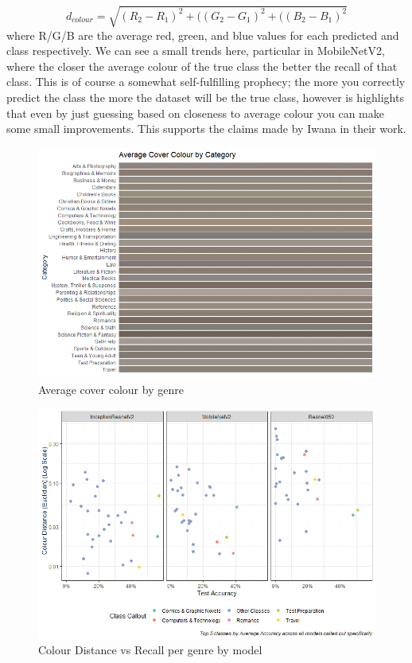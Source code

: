 \documentclass[12pt]{article}
\numberwithin{equation}{section}
\numberwithin{figure}{section}
\begin{document}
\begin{equation}
	d_{colour} = \sqrt{(R_2 - R_1)^2 + ((G_2 - G_1)^2 +((B_2 - B_1)^2 }
\end{equation}
where R/G/B are the average red, green, and blue values for each predicted and class respectively. We can see a small trends here, particular in MobileNetV2, where the closer the average colour of the true class the better the recall of that class. This is of course a somewhat self-fulfilling prophecy; the more you correctly predict the class the more the dataset will be the true class, however is highlights that even by just guessing based on closeness to average colour you can make some small improvements. This supports the claims made by Iwana in their work. 


\begin{figure}
	\centering
	\captionsetup{justification=centering}
	\includegraphics[scale=0.45]{avg_col_plot.png}
	\caption{Average cover colour by genre}
	\label{fig:avg_col}
\end{figure}

\begin{figure}
	\centering
	\captionsetup{justification=centering}
	\includegraphics[scale=0.6]{col_dist_plot.png}
	\caption{Colour Distance vs Recall per genre by model}
	\label{fig:col_distance}
\end{figure}
\end{document}
